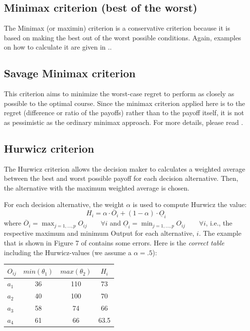 \documentclass[
  12pt,
  oneside]{book}
\theoremstyle{definition}
\theoremstyle{definition}
\theoremstyle{definition}
\theoremstyle{definition}
\theoremstyle{remark}
\begin{document}
\hypertarget{minimax-criterion-best-of-the-worst}{%
\subsection*{Minimax criterion (best of the worst)}\label{minimax-criterion-best-of-the-worst}}

The Minimax (or maximin) criterion is a conservative criterion because it is based on making the best out of the worst possible conditions. Again, examples on how to calculate it are given in \citet{Finne1998three}..

\hypertarget{savage-minimax-criterion}{%
\subsection*{Savage Minimax criterion}\label{savage-minimax-criterion}}

This criterion aims to minimize the worst-case regret to perform as closely as possible to the optimal course. Since the minimax criterion applied here is to the regret (difference or ratio of the payoffs) rather than to the payoff itself, it is not as pessimistic as the ordinary minimax approach. For more details, please read \citet{Finne1998three}.

\hypertarget{hurwicz-criterion}{%
\subsection*{Hurwicz criterion}\label{hurwicz-criterion}}

The Hurwicz criterion allows the decision maker to calculates a weighted average between the best and worst possible payoff for each decision alternative. Then, the alternative with the maximum weighted average is chosen.

For each decision alternative, the weight \(\alpha\) is used to compute Hurwicz the value:
\[H_i=\alpha \cdot \overline{O}_i + (1-\alpha)\cdot \underline{O}_i\]
where \(\overline{O}_i=\max_{j=1,\dots,p}{O_{ij}}\qquad \forall i\) and \(\underline{O}_i=\min_{j=1,\dots,p}{O_{ij}}\qquad \forall i\), i.e., the respective maximum and minimum Output for each alternative, \(i\).
The example that is shown in Figure 7 of \citet[p.401]{Finne1998three} contains some errors. Here is the \emph{correct table} including the Hurwicz-values (we assume a \(\alpha=.5\)):

\begin{longtable}[]{@{}lccc@{}}
\toprule()
\(O_{ij}\) & \(min(\theta_1)\) & \(max(\theta_2)\) & \(H_i\) \\
\midrule()
\endhead
\(a_1\) & 36 & 110 & 73 \\
\(a_2\) & 40 & 100 & 70 \\
\(a_3\) & 58 & 74 & 66 \\
\(a_4\) & 61 & 66 & 63.5 \\
\bottomrule()
\end{longtable}
\end{document}
